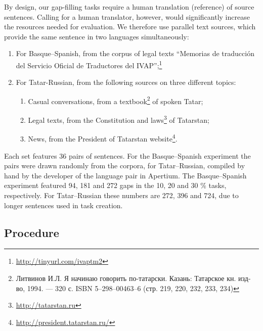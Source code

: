 \documentclass[11pt]{article}
\newcommand{\comment}[1]{}
\newcommand{\rus}[1]{\foreignlanguage{russian}{#1}}
\begin{document}
By design, our gap-filling tasks require a human translation (reference) of source sentences. Calling for a human translator, however, would significantly increase the resources needed for evaluation. We therefore use parallel text sources, which provide the same sentence in two languages simultaneously:
\begin{enumerate}
\item  For Basque--Spanish, from the corpus of legal texts ``Memorias de traducci\'on del
Servicio Oficial de Traductores del IVAP'';\footnote{\url{http://tinyurl.com/ivaptm2}} 
\item  For Tatar-Russian, from the following sources on three different topics:
  \begin{enumerate}
    \item  Casual conversations, from a textbook\footnote{\rus{Литвинов И.Л. Я начинаю говорить по-татарски. Казань: Татарское кн. изд-во, 1994. — 320 с. ISBN 5--298--00463--6 (стр. 219, 220, 232, 233, 234)}} of spoken Tatar;
    \item  Legal texts, from the Constitution and laws\footnote{\url{http://tatarstan.ru}} of Tatarstan;
    \item  News, from the President of Tatarstan website\footnote{\url{http://president.tatarstan.ru/}}.
  \end{enumerate}
\end{enumerate}

Each set features 36 pairs of sentences. For the Basque--Spanish experiment the pairs were drawn
randomly from the corpora, for Tatar--Russian, compiled by hand by the developer of the
language pair in Apertium. The Basque--Spanish experiment featured 94, 181 and 272 gaps in the 10, 20 and 30 \% tasks, respectively. For Tatar--Russian these numbers are 272, 396 and 724, due to longer sentences used in task creation. \comment{EA to JA: Ilnar wanted to test the system on his own sentences, should I put it in the paper?}

\subsection{Procedure}
\end{document}
